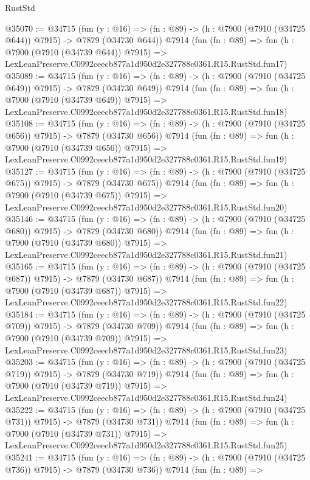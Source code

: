 \begin{lexlean}{RustStd}
\begin{coremodule}
@35070 := @34715
    (fun (y : @16) => (fn : @89) -> (h : @7900 (@7910 (@34725 @644)) @7915) -> @7879 (@34730 @644))
    @7914
    (fun (fn : @89) =>
    fun (h : @7900 (@7910 (@34739 @644)) @7915) =>
    LexLeanPreserve.C0992ceecb877a1d950d2e327788c0361.R15.RustStd.fun17)
@35089 := @34715
    (fun (y : @16) => (fn : @89) -> (h : @7900 (@7910 (@34725 @649)) @7915) -> @7879 (@34730 @649))
    @7914
    (fun (fn : @89) =>
    fun (h : @7900 (@7910 (@34739 @649)) @7915) =>
    LexLeanPreserve.C0992ceecb877a1d950d2e327788c0361.R15.RustStd.fun18)
@35108 := @34715
    (fun (y : @16) => (fn : @89) -> (h : @7900 (@7910 (@34725 @656)) @7915) -> @7879 (@34730 @656))
    @7914
    (fun (fn : @89) =>
    fun (h : @7900 (@7910 (@34739 @656)) @7915) =>
    LexLeanPreserve.C0992ceecb877a1d950d2e327788c0361.R15.RustStd.fun19)
@35127 := @34715
    (fun (y : @16) => (fn : @89) -> (h : @7900 (@7910 (@34725 @675)) @7915) -> @7879 (@34730 @675))
    @7914
    (fun (fn : @89) =>
    fun (h : @7900 (@7910 (@34739 @675)) @7915) =>
    LexLeanPreserve.C0992ceecb877a1d950d2e327788c0361.R15.RustStd.fun20)
@35146 := @34715
    (fun (y : @16) => (fn : @89) -> (h : @7900 (@7910 (@34725 @680)) @7915) -> @7879 (@34730 @680))
    @7914
    (fun (fn : @89) =>
    fun (h : @7900 (@7910 (@34739 @680)) @7915) =>
    LexLeanPreserve.C0992ceecb877a1d950d2e327788c0361.R15.RustStd.fun21)
@35165 := @34715
    (fun (y : @16) => (fn : @89) -> (h : @7900 (@7910 (@34725 @687)) @7915) -> @7879 (@34730 @687))
    @7914
    (fun (fn : @89) =>
    fun (h : @7900 (@7910 (@34739 @687)) @7915) =>
    LexLeanPreserve.C0992ceecb877a1d950d2e327788c0361.R15.RustStd.fun22)
@35184 := @34715
    (fun (y : @16) => (fn : @89) -> (h : @7900 (@7910 (@34725 @709)) @7915) -> @7879 (@34730 @709))
    @7914
    (fun (fn : @89) =>
    fun (h : @7900 (@7910 (@34739 @709)) @7915) =>
    LexLeanPreserve.C0992ceecb877a1d950d2e327788c0361.R15.RustStd.fun23)
@35203 := @34715
    (fun (y : @16) => (fn : @89) -> (h : @7900 (@7910 (@34725 @719)) @7915) -> @7879 (@34730 @719))
    @7914
    (fun (fn : @89) =>
    fun (h : @7900 (@7910 (@34739 @719)) @7915) =>
    LexLeanPreserve.C0992ceecb877a1d950d2e327788c0361.R15.RustStd.fun24)
@35222 := @34715
    (fun (y : @16) => (fn : @89) -> (h : @7900 (@7910 (@34725 @731)) @7915) -> @7879 (@34730 @731))
    @7914
    (fun (fn : @89) =>
    fun (h : @7900 (@7910 (@34739 @731)) @7915) =>
    LexLeanPreserve.C0992ceecb877a1d950d2e327788c0361.R15.RustStd.fun25)
@35241 := @34715
    (fun (y : @16) => (fn : @89) -> (h : @7900 (@7910 (@34725 @736)) @7915) -> @7879 (@34730 @736))
    @7914
    (fun (fn : @89) =>

\end{coremodule}
\end{lexlean}
